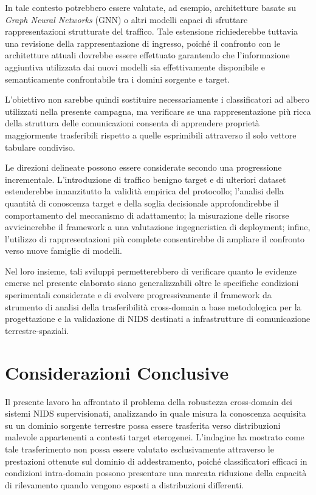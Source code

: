 In tale contesto potrebbero essere valutate, ad esempio, architetture basate su \textit{Graph Neural Networks} (GNN) o altri modelli capaci di sfruttare rappresentazioni strutturate del traffico.
Tale estensione richiederebbe tuttavia una revisione della rappresentazione di ingresso, poiché il confronto con le architetture attuali dovrebbe essere effettuato garantendo che l'informazione aggiuntiva utilizzata dai nuovi modelli sia effettivamente disponibile e semanticamente confrontabile tra i domini sorgente e target.

L'obiettivo non sarebbe quindi sostituire necessariamente i classificatori ad albero utilizzati nella presente campagna, ma verificare se una rappresentazione più ricca della struttura delle comunicazioni consenta di apprendere proprietà maggiormente trasferibili rispetto a quelle esprimibili attraverso il solo vettore tabulare condiviso.

Le direzioni delineate possono essere considerate secondo una progressione incrementale.
L'introduzione di traffico benigno target e di ulteriori dataset estenderebbe innanzitutto la validità empirica del protocollo; l'analisi della quantità di conoscenza target e della soglia decisionale approfondirebbe il comportamento del meccanismo di adattamento; la misurazione delle risorse avvicinerebbe il framework a una valutazione ingegneristica di deployment; infine, l'utilizzo di rappresentazioni più complete consentirebbe di ampliare il confronto verso nuove famiglie di modelli.

Nel loro insieme, tali sviluppi permetterebbero di verificare quanto le evidenze emerse nel presente elaborato siano generalizzabili oltre le specifiche condizioni sperimentali considerate e di evolvere progressivamente il framework da strumento di analisi della trasferibilità cross-domain a base metodologica per la progettazione e la validazione di NIDS destinati a infrastrutture di comunicazione terrestre-spaziali.




\section{Considerazioni Conclusive}
\label{sec:considerazioni_conclusive}

Il presente lavoro ha affrontato il problema della robustezza cross-domain dei sistemi NIDS supervisionati, analizzando in quale misura la conoscenza acquisita su un dominio sorgente terrestre possa essere trasferita verso distribuzioni malevole appartenenti a contesti target eterogenei.
L'indagine ha mostrato come tale trasferimento non possa essere valutato esclusivamente attraverso le prestazioni ottenute sul dominio di addestramento, poiché classificatori efficaci in condizioni intra-domain possono presentare una marcata riduzione della capacità di rilevamento quando vengono esposti a distribuzioni differenti.

